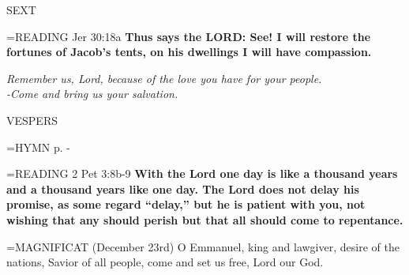 \begin{flushleft}\normalsize SEXT\\\end{flushleft}

\hangindent=\parindent \small{\uppercase{READING}} Jer 30:18a \textbf{Thus says the LORD: See! I will restore the fortunes of Jacob’s tents, on his dwellings I will have compassion.\\}

\begin{center}
\textit{Remember us, Lord, because of the love you have for your people.\\
-Come and bring us your salvation.}
\end{center}

\begin{flushleft}\normalsize VESPERS\\\end{flushleft}

\hangindent=\parindent \small{\uppercase{HYMN} p. \pageref{advent:firstHymn}-\pageref{advent:lastHymn}\\}

\hangindent=\parindent \small{\uppercase{READING}} 2 Pet 3:8b-9 \textbf{With the Lord one day is like a thousand years and a thousand years like one day. The Lord does not delay his promise, as some regard “delay,” but he is patient with you, not wishing that any should perish but that all should come to repentance.\\}

\hangindent=\parindent \small{MAGNIFICAT  (December 23rd) O Emmanuel, king and lawgiver, desire of the nations, Savior of all people, come and set us free, Lord our God.\\}
